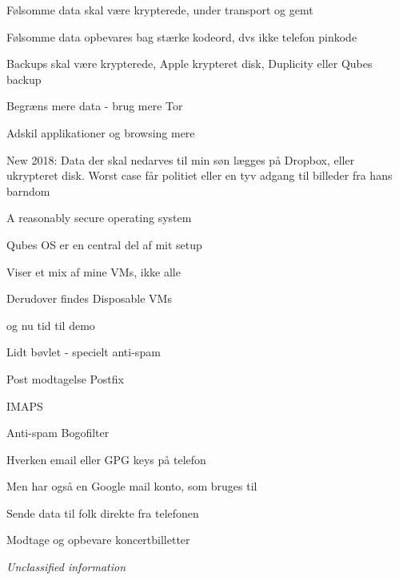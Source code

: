 \documentclass[18pt,landscape,a4paper,footrule]{foils}
\begin{document}
\begin{list1}
\item Følsomme data skal være krypterede, under transport og gemt
\item Følsomme data opbevares bag stærke kodeord, dvs ikke telefon pinkode
\item Backups skal være krypterede, Apple krypteret disk, Duplicity eller Qubes backup
\item Begræns mere data - brug mere Tor
\item Adskil applikationer og browsing mere
\item New 2018: Data der skal nedarves til min søn lægges på Dropbox, eller ukrypteret disk. Worst case får politiet eller en tyv adgang til billeder fra hans barndom
\end{list1}


A reasonably secure operating system \\


\vskip 2cm
\centerline{Qubes OS er en central del af mit setup}



\begin{list2}
\item Viser et mix af mine VMs, ikke alle
\item Derudover findes Disposable VMs
\item og nu tid til demo
\end{list2}


\begin{list2}
\item Lidt bøvlet - specielt anti-spam
\item Post modtagelse Postfix 
\item IMAPS 
\item Anti-spam Bogofilter 
\item Hverken email eller GPG keys på telefon
\end{list2}

Men har også en Google mail konto, som bruges til
\begin{list2}
\item Sende data til folk direkte fra telefonen
\item Modtage og opbevare koncertbilletter
\item \emph{Unclassified information}
\end{list2}
\end{document}
